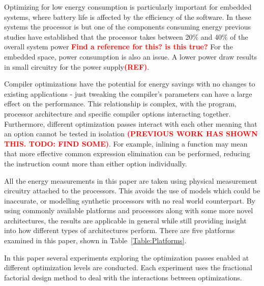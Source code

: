 \documentclass[twocolumn]{article}
\newcommand{\todo}[1]{\textbf{\textcolor{red}{#1}}}
\begin{document}
Optimizing for low energy consumption is particularly important for embedded systems, where battery life is affected by the efficiency of the software. In these systems the processor is but one of the components consuming energy previous studies have established that the processor takes between 20\% and 40\% of the overall system power \todo{Find a reference for this? is this true?} For the embedded space, power consumption is also an issue. A lower power draw results in small circuitry for the power supply\todo{(REF)}.

Compiler optimizations have the potential for energy savings with no changes to existing applications - just tweaking the compiler's parameters can have a large effect on the performance. This relationship is complex, with the program, processor architecture and specific compiler options interacting together. Furthermore, different optimization passes interact with each other meaning that an option cannot be tested in isolation \todo{(PREVIOUS WORK HAS SHOWN THIS. TODO: FIND SOME)}. For example, inlining a function may mean that more effective common expression elimination can be performed, reducing the instruction count more than either option individually.

All the energy measurements in this paper are taken using physical measurement circuitry attached to the processors. This avoids the use of models which could be inaccurate, or modelling synthetic processors with no real world counterpart. By using commonly available platforms and processors along with some more novel architectures, the results are applicable in general while still providing insight into how different types of architectures perform. There are five platforms examined in this paper, shown in Table~\ref{Table:Platforms}.

In this paper several experiments exploring the optimization passes enabled at different optimization levels are conducted. Each experiment uses the fractional factorial design method to deal with the interactions between optimizations.
\end{document}
